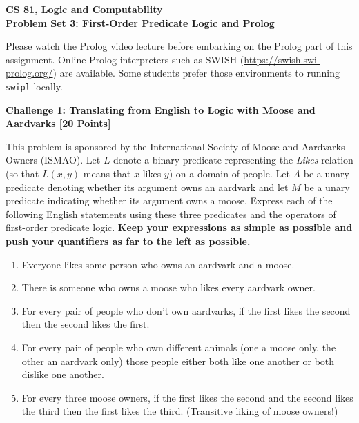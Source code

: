 \documentclass[12pt]{article}
\newcommand{\Problem}[3]{\mbox{} \newline \noindent \textbf{\textbf{Challenge #1: #2 [#3 Points] \\ }}}
\begin{document}
\begin{center}
	\bf
	CS 81, Logic and Computability  \\
	Problem Set 3:  First-Order Predicate Logic and Prolog \\
\end{center}

Please watch the Prolog video lecture before embarking on the Prolog part of this assignment. Online Prolog interpreters such as SWISH (\href{https://swish.swi-prolog.org/}{https://swish.swi-prolog.org/}) are available. Some students prefer those environments to running \texttt{swipl} locally.

\Problem{1}{Translating from English to Logic with Moose and Aardvarks}{20}

This problem is sponsored by the International Society of Moose and Aardvarks Owners (ISMAO).
Let $L$ denote a binary predicate representing the \emph{Likes} relation (so that $L(x, y)$ means that $x$ likes $y$) on a domain of people.
Let $A$ be a unary predicate denoting whether its argument owns an aardvark and let $M$ be a unary predicate indicating whether its argument owns a moose.
Express each of the following English statements using these three predicates and the operators of first-order predicate logic. \textbf{ Keep your expressions as simple as possible and push your quantifiers as far to the left as possible.}

\begin{enumerate}
	\item Everyone likes some person who owns an aardvark and a moose.
	\item There is someone who owns a moose who likes every aardvark owner.
	\item For every pair of people who don't own aardvarks, if the first likes the second then the second likes the first.
	\item For every pair of people who own different animals (one a moose only, the other an aardvark only) those people either both like one another or both dislike one another. 
	\item For every three moose owners, if the first likes the second and the second likes the third then the first likes the third.  (Transitive liking of moose owners!)
\end{enumerate}
\end{document}
